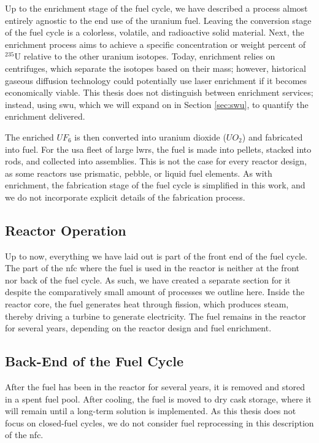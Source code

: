 Up to the enrichment stage of the fuel cycle, we have described a process
almost entirely agnostic to the end use of the uranium fuel. Leaving the
conversion stage of the fuel cycle is a colorless, volatile, and radioactive
solid material. Next, the enrichment process aims to achieve a specific
concentration or weight percent of $^{235}$U relative to the other uranium
isotopes. Today, enrichment relies on centrifuges, which separate the isotopes based on their mass; however, historical gaseous diffusion technology could potentially use laser enrichment if it becomes economically viable. This thesis does not distinguish between enrichment services; instead, using \gls{swu}, which we will expand on in Section \ref{sec:swu}, to quantify the enrichment delivered.

The enriched $UF_6$ is then converted into uranium dioxide ($UO_2$) and
fabricated into fuel. For the \gls{usa} fleet of large \glspl{lwr}, the fuel is made into pellets, stacked into rods, and collected into assemblies. This is not the case for every reactor design, as some reactors use prismatic, pebble, or liquid fuel elements. As with enrichment, the fabrication stage of the fuel cycle is simplified in this work, and we do not incorporate explicit details of the fabrication process.

\subsection{Reactor Operation}
\label{sec:reactor_operation}
Up to now, everything we have laid out is part of the front end of the fuel
cycle. The part of the \gls{nfc} where the fuel is used in the reactor is
neither at the front nor back of the fuel cycle. As such, we have created a
separate section for it despite the comparatively small amount of processes we
outline here. Inside the reactor core, the fuel generates heat through fission,
which produces steam, thereby driving a turbine to generate electricity. The fuel remains in the reactor for several years, depending on the reactor design and fuel enrichment. %


\subsection{Back-End of the Fuel Cycle}
\label{sec:back_end}
After the fuel has been in the reactor for several years, it is removed and
stored in a spent fuel pool. After cooling, the fuel is moved to dry cask
storage, where it will remain until a long-term solution is implemented. As
this thesis does not focus on closed-fuel cycles, we do not consider fuel
reprocessing in this description of the \gls{nfc}.

